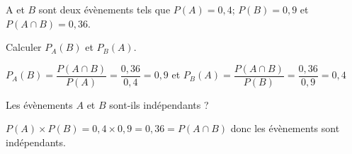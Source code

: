 \documentclass[11pt,a4paper]{article}  %
\begin{document}
A et $B$ sont deux évènements tels que $P(A)=0,4$; $P(B)=0,9$ et $P(A \cap B)=0,36$.
\begin{enumMet}
	\item Calculer $P_A(B)$ et $P_B(A)$.
	\begin{corrBox}
		$P_A(B)=\dfrac{P(A \cap B)}{P(A)}=\dfrac{0,36}{0,4}=0,9$ et $P_B(A)=\dfrac{P(A \cap B)}{P(B)}=\dfrac{0,36}{0,9}=0,4$
	\end{corrBox}
	\item Les évènements $A$ et $B$ sont-ils indépendants ?
	\begin{corrBox}
		$P(A)\times P(B)=0,4\times0,9=0,36=P(A \cap B)$ donc les évènements sont indépendants.
	\end{corrBox}
\end{enumMet}
\end{document}
